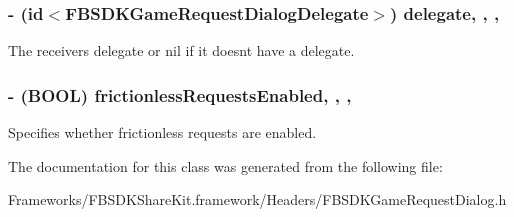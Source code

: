 \subsubsection[{delegate}]{\setlength{\rightskip}{0pt plus 5cm}-\/ (id$<${\bf F\+B\+S\+D\+K\+Game\+Request\+Dialog\+Delegate}$>$) delegate\hspace{0.3cm}{\ttfamily [read]}, {\ttfamily [write]}, {\ttfamily [nonatomic]}, {\ttfamily [weak]}}\label{interface_f_b_s_d_k_game_request_dialog_ac33aec2227f6156213a0f8a734d040b2}
The receiver\textquotesingle{}s delegate or nil if it doesn\textquotesingle{}t have a delegate. \hypertarget{interface_f_b_s_d_k_game_request_dialog_a4bb722ee3374be16b2eb9a544f40ca9f}{}
\subsubsection[{frictionless\+Requests\+Enabled}]{\setlength{\rightskip}{0pt plus 5cm}-\/ (B\+O\+O\+L) frictionless\+Requests\+Enabled\hspace{0.3cm}{\ttfamily [read]}, {\ttfamily [write]}, {\ttfamily [nonatomic]}, {\ttfamily [assign]}}\label{interface_f_b_s_d_k_game_request_dialog_a4bb722ee3374be16b2eb9a544f40ca9f}
Specifies whether frictionless requests are enabled. 

The documentation for this class was generated from the following file\+:\begin{DoxyCompactItemize}
\item 
Frameworks/\+F\+B\+S\+D\+K\+Share\+Kit.\+framework/\+Headers/F\+B\+S\+D\+K\+Game\+Request\+Dialog.\+h\end{DoxyCompactItemize}
